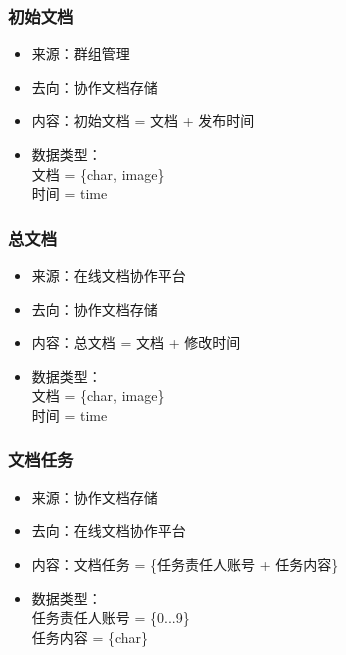             \subsubsection{初始文档}
            \begin{itemize}
            \item 来源：群组管理
            \item 去向：协作文档存储
            \item 内容：初始文档 = 文档 + 发布时间
            \item 数据类型：\\
            文档 = \{char, image\}\\
            时间 = time\\
            
            \end{itemize}

            \subsubsection{总文档}
            \begin{itemize}
            \item 来源：在线文档协作平台
            \item 去向：协作文档存储
            \item 内容：总文档 = 文档 + 修改时间
            \item 数据类型：\\
            文档 = \{char, image\}\\
            时间 = time\\
            
            \end{itemize}

            \subsubsection{文档任务}
            \begin{itemize}
            \item 来源：协作文档存储
            \item 去向：在线文档协作平台
            \item 内容：文档任务 = \{任务责任人账号 + 任务内容\}
            \item 数据类型：\\
            任务责任人账号 = \{0...9\}\\
            任务内容 = \{char\}\\
              
            \end{itemize}


